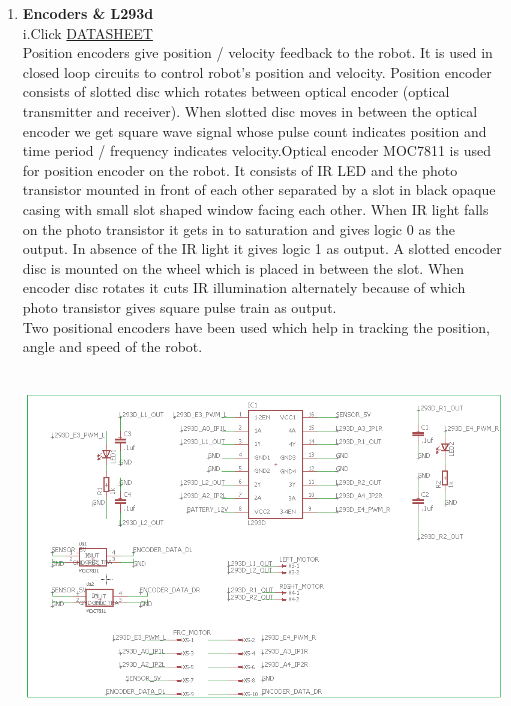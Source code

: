 \documentclass[a4paper,12pt,oneside]{book}
\begin{document}
\begin{enumerate}
   \newpage \item \textbf{Encoders & L293d}\\
    i.Click \href{http://www.datasheetspdf.com/datasheet/MOC7811.html}{DATASHEET}
    \\[0.5cm]Position encoders give position / velocity feedback to the robot. It is used in closed loop circuits to control robot’s position and velocity. Position encoder consists of slotted disc which rotates between optical encoder (optical transmitter and receiver). When slotted disc moves in between the optical encoder we get square wave signal whose pulse count indicates position and time period / frequency indicates velocity.Optical encoder MOC7811 is used for position encoder on the robot. It consists of IR LED and the photo transistor mounted in front of each other separated by a slot in black opaque casing with small slot shaped window facing each other.
    When IR light falls on the photo transistor it gets in to saturation and gives logic 0 as the output. In absence of the IR light it gives logic 1 as output. A slotted encoder disc is mounted on the wheel which is placed in between the slot. When encoder disc rotates it cuts IR illumination alternately because of which photo transistor gives square pulse train as output.
    \\Two positional encoders have been used which help in tracking the position, angle and speed of the robot.
    \\\hfill\includegraphics[width=13cm, height=10cm]{enc}
    

\end{enumerate}
\end{document}
